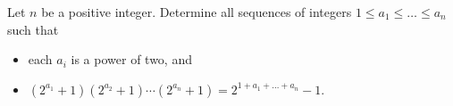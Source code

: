 Let $n$ be a positive integer.
Determine all sequences of integers $1 \leq a_1  \leq \dots \leq a_n$ such that
\begin{itemize}
    \item each $a_i$ is a power of two, and
    \item $\left( 2^{a_1} + 1\right)(2^{a_2}+1) \cdots \left( 2^{a_n} + 1\right) =
        2^{1 + a_1 + \dots + a_n} - 1.$
\end{itemize}
